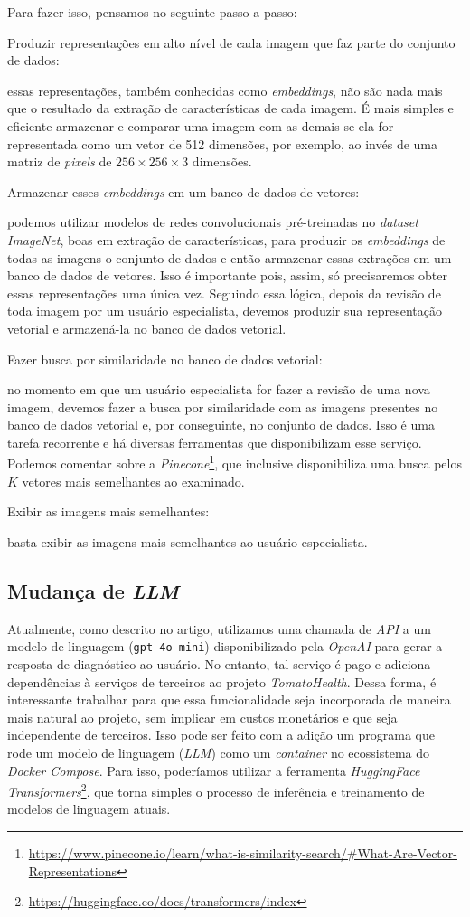 Para fazer isso, pensamos no seguinte passo a passo:
\begin{enumerate}
    {\bf  \item Produzir representações em alto nível de cada imagem que faz parte do conjunto de dados:} essas representações, também conhecidas como \emph{embeddings}, não são nada mais que o resultado da extração de características de cada imagem. É mais simples e eficiente armazenar e comparar uma imagem com as demais se ela for representada como um vetor de 512 dimensões, por exemplo, ao invés de uma matriz de \emph{pixels} de $256 \times 256 \times 3$ dimensões.
    {\bf \item Armazenar esses \emph{embeddings} em um banco de dados de vetores:} podemos utilizar modelos de redes convolucionais pré-treinadas no \emph{dataset ImageNet}, boas em extração de características, para produzir os \emph{embeddings} de todas as imagens o conjunto de dados e então armazenar essas extrações em um banco de dados de vetores. Isso é importante pois, assim, só precisaremos obter essas representações uma única vez. Seguindo essa lógica, depois da revisão de toda imagem por um usuário especialista, devemos produzir sua representação vetorial e armazená-la no banco de dados vetorial.
    {\bf \item Fazer busca por similaridade no banco de dados vetorial:} no momento em que um usuário especialista for fazer a revisão de uma nova imagem, devemos fazer a busca por similaridade com as imagens presentes no banco de dados vetorial e, por conseguinte, no conjunto de dados. Isso é uma tarefa recorrente e há diversas ferramentas que disponibilizam esse serviço. Podemos comentar sobre a \emph{Pinecone}\footnote{\url{https://www.pinecone.io/learn/what-is-similarity-search/\#What-Are-Vector-Representations}}, que inclusive disponibiliza uma busca pelos $K$ vetores mais semelhantes ao examinado.
     {\bf \item Exibir as imagens mais semelhantes:} basta exibir as imagens mais semelhantes ao usuário especialista.
\end{enumerate}

\subsection{Mudança de \emph{LLM}}

Atualmente, como descrito no artigo, utilizamos uma chamada de \textit{API} a um modelo de linguagem (\texttt{gpt-4o-mini}) disponibilizado pela \textit{OpenAI} para gerar a resposta de diagnóstico ao usuário. No entanto, tal serviço é pago e adiciona dependências à serviços de terceiros ao projeto \emph{TomatoHealth}. Dessa forma, é interessante trabalhar para que essa funcionalidade seja incorporada de maneira mais natural ao projeto, sem implicar em custos monetários e que seja independente de terceiros. Isso pode ser feito com a adição um programa que rode um modelo de linguagem (\emph{LLM}) como um \emph{container} no ecossistema do \emph{Docker Compose}. Para isso, poderíamos utilizar a ferramenta \emph{HuggingFace Transformers}\footnote{\url{https://huggingface.co/docs/transformers/index}}, que torna simples o processo de inferência e treinamento de modelos de linguagem atuais.
